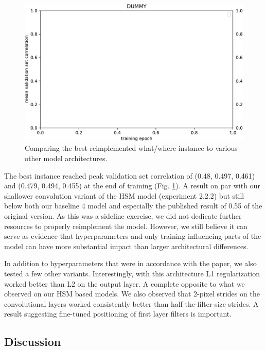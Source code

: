 \begin{figure}[H]
    \centering
    \includegraphics[width=1\textwidth]{../figures/05_dummy}
    \caption[Experiment 2.2.5]{Comparing the best reimplemented what/where instance to various other model architectures.}
    \label{fig:5.2.2.5}
\end{figure}

The best instance reached peak validation set correlation of (0.48, 0.497, 0.461) and (0.479, 0.494, 0.455) at the end of training (Fig. \ref{fig:5.2.2.5}). A result on par with our shallower convolution variant of the HSM model (experiment 2.2.2) but still below both our baseline 4 model and especially the published result of 0.55 of the original \citeauthor{klidnt} version. As this was a sideline exercise, we did not dedicate further resources to properly reimplement the model. However, we still believe it can serve as evidence that hyperparameters and only training influencing parts of the model can have more substantial impact than larger architectural differences.

In addition to hyperparameters that were in accordance with the paper, we also tested a few other variants. Interestingly, with this architecture L1 regularization worked better than L2 on the output layer. A complete opposite to what we observed on our HSM based models. We also observed that 2-pixel strides on the convolutional layers worked consistently better than half-the-filter-size strides. A result suggesting fine-tuned positioning of first layer filters is important.

\subsection{Discussion}

